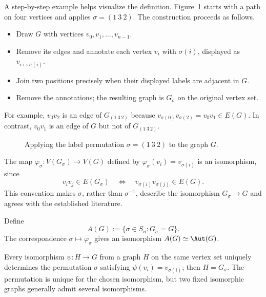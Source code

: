 A step-by-step example helps visualize the definition.
Figure~\ref{fig:sigma_intro} starts with a path on four vertices and applies $\sigma=(1\ 3\ 2)$.
The construction proceeds as follows.
\begin{itemize}
    \item[(a)] Draw $G$ with vertices $v_0,v_1,\dots,v_{n-1}$.
    \item[(b)] Remove its edges and annotate each vertex $v_i$ with $\sigma(i)$, displayed as $v_{i\mapsto\sigma(i)}$.
    \item[(c)] Join two positions precisely when their displayed labels are adjacent in $G$.
    \item[(d)] Remove the annotations; the resulting graph is $G_\sigma$ on the original vertex set.
\end{itemize}

For example, $v_0v_2$ is an edge of $G_{(1\ 3\ 2)}$ because
$v_{\sigma(0)}v_{\sigma(2)}=v_0v_1\in E(G)$.
In contrast, $v_0v_1$ is an edge of $G$ but not of $G_{(1\ 3\ 2)}$.

\begin{figure}[htbp]
    \centering
    
    \caption{Applying the label permutation $\sigma=(1\ 3\ 2)$ to the graph $G$.}
    \label{fig:sigma_intro}
\end{figure}

\begin{remark}\label{rmk:iso-perm}
    The map $\varphi_\sigma\colon V(G_\sigma)\to V(G)$ defined by $\varphi_\sigma(v_i)=v_{\sigma(i)}$ is an isomorphism, since
    \[
        v_iv_j\in E(G_\sigma)\quad\Longleftrightarrow\quad
        v_{\sigma(i)}v_{\sigma(j)}\in E(G).
    \]
    This convention makes $\sigma$, rather than $\sigma^{-1}$, describe the isomorphism $G_\sigma\to G$ and agrees with the established literature.
\end{remark}

\begin{definition}\label{def:automorphism-label-group}
    Define
    \[
        A(G):=\{\sigma\in S_n:G_\sigma=G\}.
    \]
    The correspondence $\sigma\mapsto\varphi_\sigma$ gives an isomorphism $A(G)\simeq\Aut(G)$.
\end{definition}

Every isomorphism $\psi\colon H\to G$ from a graph $H$ on the same vertex set uniquely determines the permutation $\sigma$ satisfying $\psi(v_i)=v_{\sigma(i)}$; then $H=G_\sigma$.
The permutation is unique for the chosen isomorphism, but two fixed isomorphic graphs generally admit several isomorphisms.

